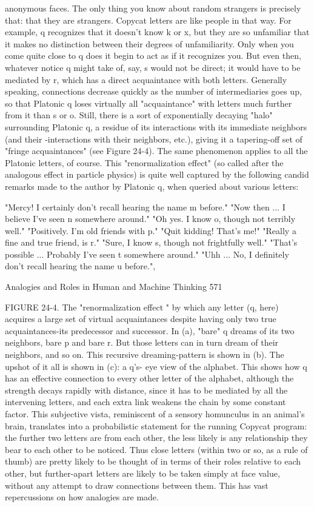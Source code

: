 anonymous faces. The only thing you know about random strangers is precisely that:
that they are strangers. Copycat letters are like people in that way.
        For example, q recognizes that it doesn't know k or x, but they are so
unfamiliar that it makes no distinction between their degrees of unfamiliarity. Only
when you come quite close to q does it begin to act as if it recognizes you. But even
then, whatever notice q might take of, say, s would not be direct; it would have to be
mediated by r, which has a direct acquaintance with both letters. Generally speaking,
connections decrease quickly as the number of intermediaries goes up, so that
Platonic q loses virtually all "acquaintance" with letters much further from it than s or
o. Still, there is a sort of exponentially decaying "halo" surrounding Platonic q, a
residue of its interactions with its immediate neighbors (and their -interactions with
their neighbors, etc.), giving it a tapering-off set of "fringe acquaintances" (see Figure
24-4). The same phenomenon applies to all the Platonic letters, of course.
        This "renormalization effect" (so called after the analogous effect in particle
physics) is quite well captured by the following candid remarks made to the author by
Platonic q, when queried about various letters:

"Mercy! I certainly don't recall hearing the name m before."
"Now then ... I believe I've seen n somewhere around."
"Oh yes. I know o, though not terribly well."
"Positively. I'm old friends with p."
"Quit kidding! That's me!"
"Really a fine and true friend, is r."
"Sure, I know s, though not frightfully well."
"That's possible ... Probably I've seen t somewhere around."
"Uhh ... No, I definitely don't recall hearing the name u before.",




Analogies and Roles in Human and Machine Thinking                                     571

FIGURE 24-4. The "renormalization effect " by which any letter (q, here) acquires a
large set of virtual acquaintances despite having only two true acquaintances-its
predecessor and successor. In (a), "bare" q dreams of its two neighbors, bare p and
bare r. But those letters can in turn dream of their neighbors, and so on. This
recursive dreaming-pattern is shown in (b). The upshot of it all is shown in (c): a q's-
eye view of the alphabet. This shows how q has an effective connection to every other
letter of the alphabet, although the strength decays rapidly with distance, since it has
to be mediated by all the intervening letters, and each extra link weakens the chain by
some constant factor. This subjective vista, reminiscent of a sensory homunculus in an
animal's brain, translates into a probabilistic statement for the running Copycat
program: the further two letters are from each other, the less likely is any relationship
they bear to each other to be noticed. Thus close letters (within two or so, as a rule of
thumb) are pretty likely to be thought of in terms of their roles relative to each other,
but further-apart letters are likely to be taken simply at face value, without any
attempt to draw connections between them. This has vast repercussions on how
analogies are made.




